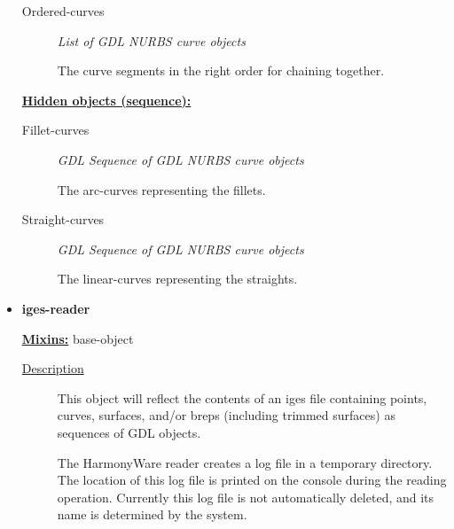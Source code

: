 \documentclass [11pt]{book}
\begin{document}
\begin{itemize}
\begin{description}

\item [Ordered-curves]
\emph{List of GDL NURBS curve objects}

 The curve segments in the right order for chaining together.




\end{description}






\textbf{
\underline{Hidden objects (sequence):}}

\begin{description}

\item [Fillet-curves]
\emph{GDL Sequence of GDL NURBS curve objects}

 The arc-curves representing the fillets.




\item [Straight-curves]
\emph{GDL Sequence of GDL NURBS curve objects}

 The linear-curves representing the straights.




\end{description}







\item {}
\label{prim:iges-reader}
\textbf{iges-reader}


\textbf{
\underline{Mixins:}} base-object





\begin{description}

\item [
\underline{Description}]


This object will reflect the contents of an iges file containing
points, curves, surfaces, and/or breps (including trimmed surfaces) as sequences of GDL objects. 

The HarmonyWare reader creates a log file in a temporary directory. The location of this log
file is printed on the console during the reading operation. Currently this log file is
not automatically deleted, and its name is determined by the system.






\end{description}
\end{itemize}
\end{document}

